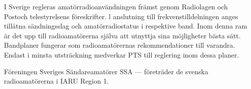 I Sverige regleras amatörradioanvändningen främst genom Radiolagen och Postoch
telestyrelsens föreskrifter. l anslutning till frekvenstilldelningen anges
tillåtna sändningsslag och amatörradiostatus i respektive band. Inom denna ram
är det upp till radioamatörerna själva att utnyttja sina möjligheter bästa sätt.
Bandplaner fungerar som radioamatörernas rekommendationer till varandra. Endast
i minsta utsträckning medverkar PTS till reglering inom dessa planer.



Föreningen Sveriges Sändareamatörer SSA --- företräder de svenska
radioamatörerna i IARU Region 1.
